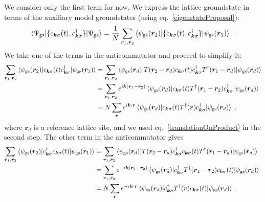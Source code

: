 We consider only the first term for now. We express the lattice groundstate in terms of the auxiliary model groundstates (using eq.~\ref{eigenstateProposal}):
\begin{equation}\begin{aligned}\label{retarded}
	\braket{\Psi_\text{gs} | \{ c_{{\bm k}\sigma}(t), c^\dagger_{{\bm k}\sigma} \} | \Psi_\text{gs}} = \frac{1}{N}\sum_{\bm r_1,\bm r_2} \braket{\psi_\text{gs}({\bm r_2}) | \{ c_{{\bm k}\sigma}(t), c^\dagger_{{\bm k}\sigma} \} | \psi_\text{gs}({\bm r_1})}~.
\end{aligned}\end{equation}
We take one of the terms in the anticommutator and proceed to simplify it:
\begin{equation}\begin{aligned}\label{kspaceGreenInterm}
	\sum_{\bm r_1,\bm r_2} \braket{\psi_\text{gs}({\bm r_2}) | c_{{\bm k}\sigma}(t) c^\dagger_{{\bm k}\sigma} | \psi_\text{gs}({\bm r_1})} &= \sum_{\bm r_1,\bm r_2} \braket{\psi_\text{gs}({\bm r_d}) | T({\bm r_2 - \bm r_d}) c_{{\bm k}\sigma}(t) c^\dagger_{{\bm k}\sigma} T^\dagger({\bm r_1 - \bm r_d}) | \psi_\text{gs}({\bm r_d})}\\
																																		   &= \sum_{\bm r_1,\bm r_2} e^{i\bm k(\bm r_1 - \bm r_2)} \braket{\psi_\text{gs}({\bm r_d}) | c_{{\bm k}\sigma}(t) T^\dagger({\bm r_1 - \bm r_2}) c^\dagger_{{\bm k}\sigma} | \psi_\text{gs}({\bm r_d})}~\\
																																		   &= N\sum_{\bm r} e^{i\bm k \cdot\bm r} \braket{\psi_\text{gs}({\bm r_d}) | c_{{\bm k}\sigma}(t) T^\dagger(\bm r) c^\dagger_{{\bm k}\sigma} | \psi_\text{gs}({\bm r_d})}~.
\end{aligned}\end{equation}
where \({\bm r_d}\) is a reference lattice site, and we used eq.~\ref{translationOnProduct} in the second step. The other term in the anticommutator gives
\begin{equation}\begin{aligned}
	\sum_{\bm r_1,\bm r_2} \braket{\psi_\text{gs}({\bm r_2}) | c^\dagger_{{\bm k}\sigma} c_{{\bm k}\sigma}(t) | \psi_\text{gs}({\bm r_1})} &= \sum_{\bm r_1,\bm r_2} \braket{\psi_\text{gs}({\bm r_d}) | T({\bm r_2 - \bm r_d}) c^\dagger_{{\bm k}\sigma} c_{{\bm k}\sigma}(t) T^\dagger({\bm r_1 - \bm r_d}) | \psi_\text{gs}({\bm r_d})}\\
																																		   &= \sum_{\bm r_1,\bm r_2} e^{-i\bm k(\bm r_1 - \bm r_2)} \braket{\psi_\text{gs}({\bm r_d}) | c^\dagger_{{\bm k}\sigma} T^\dagger({\bm r_1 - \bm r_2}) c_{{\bm k}\sigma}(t) | \psi_\text{gs}({\bm r_d})}~\\
																																		   &= N\sum_{\bm r} e^{-i\bm k\cdot\bm r} \braket{\psi_\text{gs}({\bm r_d}) | c^\dagger_{{\bm k}\sigma} T^\dagger({\bm r}) c_{{\bm k}\sigma}(t) | \psi_\text{gs}({\bm r_d})}~.
\end{aligned}\end{equation}
